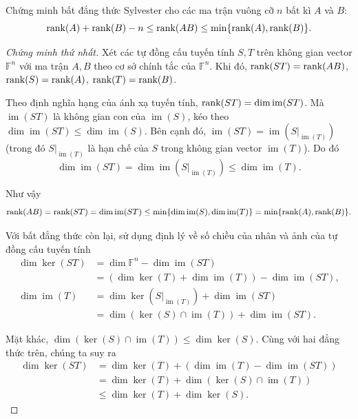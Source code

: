 \begin{exercise}
    Chứng minh bất đẳng thức Sylvester cho các ma trận vuông cỡ $n$ bất kì $A$ và $B$:
    \[
        \text{rank}(A) + \text{rank}(B) - n \le \text{rank}(AB) \le \min\{ \text{rank}(A), \text{rank}(B) \}.
    \]
\end{exercise}

\begin{proof}[Chứng minh thứ nhất]
    Xét các tự đồng cấu tuyến tính $S, T$ trên không gian vector $\mathbb{F}^{n}$ với ma trận $A, B$ theo cơ sở chính tắc của $\mathbb{F}^{n}$. Khi đó, $\text{rank}(ST) = \text{rank}(AB)$, $\text{rank}(S) = \text{rank}(A)$, $\text{rank}(T) = \text{rank}(B)$.

    Theo định nghĩa hạng của ánh xạ tuyến tính, $\text{rank}(ST) = \dim \operatorname{im}(ST)$. Mà $\operatorname{im}(ST)$ là không gian con của $\operatorname{im}(S)$, kéo theo $\dim \operatorname{im}(ST) \leq \dim \operatorname{im}(S)$. Bên cạnh đó, $\operatorname{im}(ST) = \operatorname{im}(S\vert_{\operatorname{im}(T)})$ (trong đó $S\vert_{\operatorname{im}(T)}$ là hạn chế của $S$ trong không gian vector $\operatorname{im}(T)$). Do đó
    \[
        \dim \operatorname{im}(ST) = \dim \operatorname{im}(S\vert_{\operatorname{im}(T)}) \leq \dim \operatorname{im}(T).
    \]

    Như vậy
    \[
        \text{rank}(AB) = \text{rank}(ST) = \dim \operatorname{im}(ST) \leq \min\{ \dim \operatorname{im}(S), \dim \operatorname{im}(T) \} = \min\{ \text{rank}(A), \text{rank}(B) \}.
    \]

    Với bất đẳng thức còn lại, sử dụng định lý về số chiều của nhân và ảnh của tự đồng cấu tuyến tính
    \begin{align*}
        \dim\ker(ST) & = \dim \mathbb{F}^{n} - \dim\operatorname{im}(ST) \\
                     & = (\dim \ker(T) + \dim \operatorname{im}(T)) - \dim\operatorname{im}(ST), \\
        \dim\operatorname{im}(T) & = \dim\ker{(S\vert_{\operatorname{im}(T)})} + \dim\operatorname{im}(ST) \\
                                 & = \dim(\ker(S) \cap \operatorname{im}(T)) + \dim\operatorname{im}(ST).
    \end{align*}

    Mặt khác, $\dim(\ker(S) \cap \operatorname{im}(T)) \leq \dim\ker(S)$. Cùng với hai đẳng thức trên, chúng ta suy ra
    \begin{align*}
        \dim\ker(ST) & = \dim \ker(T) + (\dim \operatorname{im}(T) - \dim\operatorname{im}(ST)) \\
                     & = \dim \ker(T) + \dim(\ker(S) \cap \operatorname{im}(T)) \\
                     & \leq \dim \ker(T) + \dim\ker(S).
    \end{align*}


\end{proof}
